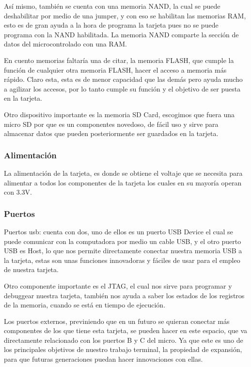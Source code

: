 Así mismo, también se cuenta con una memoria NAND, la cual se puede
deshabilitar por medio de una jumper, y con eso se habilitan las memorias
RAM, esto es de gran ayuda a la hora de programa la tarjeta pues no
se puede programa con la NAND habilitada. La memoria NAND comparte
la sección de datos del microcontrolado con una RAM.

En cuento memorias faltaría una de citar, la memoria FLASH, que cumple
la función de cualquier otra memoria FLASH, hacer el acceso a memoria
más rápido. Claro esta, esta es de menor capacidad que las demás pero
ayuda mucho a agilizar los accesos, por lo tanto cumple su función
y el objetivo de ser puesta en la tarjeta.

Otro dispositivo importante es la memoria SD Card, escogimos que fuera
una micro SD por que es un componentes novedoso, de fácil uso y sirve
para almacenar datos que pueden posteriormente ser guardados en la
tarjeta.

\pagebreak{}


\subsubsection*{Alimentaci\'on}

La alimentaci\'{o}n de la tarjeta, es donde se obtiene el voltaje
que se necesita para alimentar a todos los componentes de la tarjeta
los cuales en su mayoría operan con 3.3V. 


\subsubsection*{Puertos}

Puertos usb: cuenta con dos, uno de ellos es un puerto USB Device
el cual se puede comunicar con la computadora por medio un cable USB,
y el otro puerto USB es Host, lo que nos permite directamente conectar
nuestra memoria USB a la tarjeta, estas son unas funciones innovadoras
y fáciles de usar para el empleo de nuestra tarjeta. 

Otro componente importante es el JTAG, el cual nos sirve para programar
y debuggear nuestra tarjeta, tambi\'{e}n nos ayuda a saber los estados
de los registros de la memoria, cuando se est\'{a} en tiempo de ejecuci\'{o}n.

Los puertos externos, previniendo que en un futuro se quieran conectar
m\'{a}s componentes de los que tiene esta tarjeta, se pueden hacer
en este espacio, que va directamente relacionado con los puertos B
y C del micro. Ya que este es uno de los principales objetivos de
nuestro trabajo terminal, la propiedad de expansión, para que futuras
generaciones puedan hacer innovaciones con ellas. 



